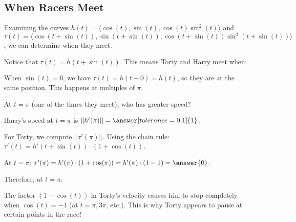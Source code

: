 \documentclass{ximera}
\begin{document}
\subsection*{When Racers Meet}

\begin{problem}
    Examining the curves $h(t)=\langle \cos(t), \sin(t), \cos(t)\sin^2(t)\rangle$ and $\tau(t)=\langle \cos(t+\sin(t)), \sin(t+\sin(t)), \cos(t+\sin(t))\sin^2(t+\sin(t))\rangle$, we can determine when they meet.
    
    Notice that $\tau(t)=h(t+\sin(t))$. This means Torty and Harry meet when:
    \begin{multipleChoice}
    \end{multipleChoice}
    
    \begin{feedback}
        When $\sin(t)=0$, we have $\tau(t)=h(t+0)=h(t)$, so they are at the same position. This happens at multiples of $\pi$.
    \end{feedback}
\end{problem}

\begin{problem}
    At $t=\pi$ (one of the times they meet), who has greater speed?
    
    Harry's speed at $t=\pi$ is $||h'(\pi)||=\answer[tolerance=0.1]{1}$.
    
    For Torty, we compute $||\tau'(\pi)||$. Using the chain rule: $\tau'(t)=h'(t+\sin(t))\cdot(1+\cos(t))$.
    
    At $t=\pi$: $\tau'(\pi)=h'(\pi)\cdot(1+\cos(\pi))=h'(\pi)\cdot(1-1)=\answer{0}$.
    
    Therefore, at $t=\pi$:
    \begin{multipleChoice}
    \end{multipleChoice}
    
    \begin{feedback}
        The factor $(1+\cos(t))$ in Torty's velocity causes him to stop completely when $\cos(t)=-1$ (at $t=\pi, 3\pi$, etc.). This is why Torty appears to pause at certain points in the race!
    \end{feedback}
\end{problem}
\end{document}
